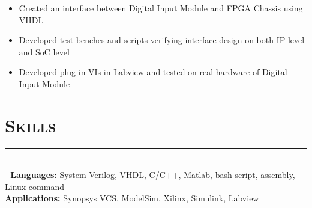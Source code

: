 \documentclass[11pt]{res}
\newcommand{\style}[1]{\color{Blue}\large\textsc{#1}}
\begin{document}
\begin{resume}
 \begin{itemize}[leftmargin=-0.1in]
   
  \item Created an interface between Digital Input Module and FPGA Chassis using VHDL\vspace{-5pt}
  \item Developed test benches and scripts verifying interface design on both IP level and SoC level \vspace{-5pt}
  \item Developed plug-in VIs in Labview and tested on real hardware of Digital Input Module\\
   \end{itemize}\vspace{-28pt}
   
   
\section{\style{Skills}}
\vspace{-10pt}
\rule{18cm}{0.5mm}\\
 -\sectionwidth \resumewidth
 \textbf{Languages:}  System Verilog, VHDL, C/C++, Matlab, bash script, assembly, Linux command    \hfill \vspace{-0.5mm}\\
  \textbf{Applications:} Synopsys VCS,  ModelSim, Xilinx, Simulink, Labview\\%

   
   

\end{resume}
\end{document}
